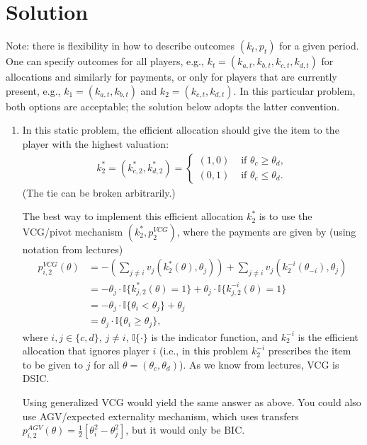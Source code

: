 \documentclass[a4paper]{article}
\newif\ifsolutions
\begin{document}
	
\ifsolutions
\section*{Solution}
	Note: there is flexibility in how to describe outcomes $(k_t,p_t)$ for a given period. One can specify outcomes for all players, e.g., $k_t = (k_{a,t},k_{b,t},k_{c,t},k_{d,t})$ for allocations and similarly for payments, or only for players that are currently present, e.g., $k_1 = (k_{a,t},k_{b,t})$ and $k_2 = (k_{c,t},k_{d,t})$. In this particular problem, both options are acceptable; the solution below adopts the latter convention.
	\begin{enumerate}
		\item In this static problem, the efficient allocation should give the item to the player with the highest valuation:
		\begin{align*}
			k^*_2 = (k^*_{c,2},k^*_{d,2}) = 
			\begin{cases}
				(1,0) & \text{ if } \theta_c \geq \theta_d,
				\\
				(0,1) & \text{ if } \theta_c \leq \theta_d.
			\end{cases}
		\end{align*}
		(The tie can be broken arbitrarily.)
		
		The best way to implement this efficient allocation $k^*_2$ is to use the VCG/pivot mechanism $(k^*_2,p^{VCG}_2)$, where the payments are given by (using notation from lectures)
		\begin{align*}
			p^{VCG}_{i,2} (\theta) &= -\left(\sum_{j\neq i}  v_{j}(k^*_2(\theta), \theta_{j}) \right) + \sum_{j\neq i} v_{j}(k^{-i}_2(\theta_{-i}), \theta_{j})
			\\
			&= - \theta_j \cdot \mathbb{I} \{ k^*_{j,2} (\theta) = 1 \} + \theta_j \cdot \mathbb{I} \{ k^{-i}_{j,2} (\theta) = 1 \}
			\\
			&= - \theta_j \cdot \mathbb{I} \{ \theta_i < \theta_j \} + \theta_j
			\\
			&= \theta_j \cdot \mathbb{I} \{ \theta_i \geq \theta_j \},
		\end{align*}
		where $i,j \in \{c,d\}$, $j\neq i$, $\mathbb{I} \{\cdot\}$ is the indicator function, and $k^{-i}_2$ is the efficient allocation that ignores player $i$ (i.e., in this problem $k^{-i}_2$ prescribes the item to be given to $j$ for all $\theta=(\theta_c,\theta_d)$). As we know from lectures, VCG is DSIC.
		
		Using generalized VCG would yield the same answer as above. You could also use AGV/expected externality mechanism, which uses transfers $p^{AGV}_{i,2} (\theta) = \frac{1}{2} \left[ \theta_i^2 - \theta_j^2 \right]$, but it would only be BIC.
		

\end{enumerate}
\end{document}
